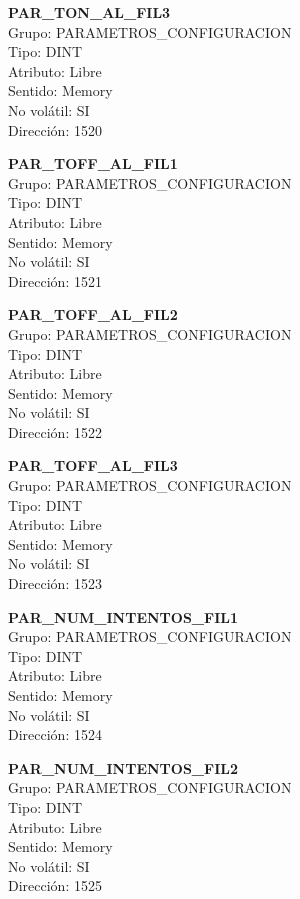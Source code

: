 \textbf{PAR\_TON\_AL\_FIL3}\\Grupo: PARAMETROS\_CONFIGURACION\\Tipo: DINT\\Atributo: Libre\\Sentido: Memory\\No volátil: SI\\Dirección: 1520

\vspace{10mm}

\textbf{PAR\_TOFF\_AL\_FIL1}\\Grupo: PARAMETROS\_CONFIGURACION\\Tipo: DINT\\Atributo: Libre\\Sentido: Memory\\No volátil: SI\\Dirección: 1521

\vspace{10mm}

\textbf{PAR\_TOFF\_AL\_FIL2}\\Grupo: PARAMETROS\_CONFIGURACION\\Tipo: DINT\\Atributo: Libre\\Sentido: Memory\\No volátil: SI\\Dirección: 1522

\vspace{10mm}

\textbf{PAR\_TOFF\_AL\_FIL3}\\Grupo: PARAMETROS\_CONFIGURACION\\Tipo: DINT\\Atributo: Libre\\Sentido: Memory\\No volátil: SI\\Dirección: 1523

\vspace{10mm}

\textbf{PAR\_NUM\_INTENTOS\_FIL1}\\Grupo: PARAMETROS\_CONFIGURACION\\Tipo: DINT\\Atributo: Libre\\Sentido: Memory\\No volátil: SI\\Dirección: 1524

\vspace{10mm}

\textbf{PAR\_NUM\_INTENTOS\_FIL2}\\Grupo: PARAMETROS\_CONFIGURACION\\Tipo: DINT\\Atributo: Libre\\Sentido: Memory\\No volátil: SI\\Dirección: 1525

